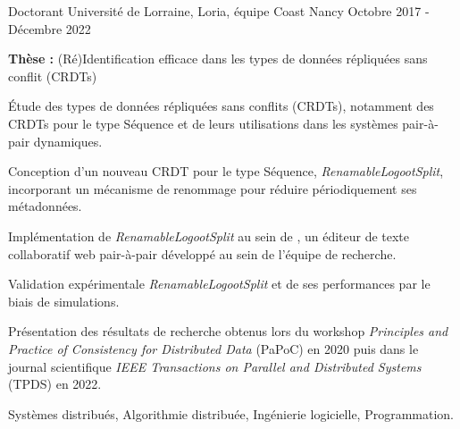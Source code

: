 
\begin{cventries}

\cventry
    {Doctorant}
    {Université de Lorraine, Loria, équipe Coast}
    {Nancy}
    {Octobre 2017 - Décembre 2022}
    {}

\vspace{-1.5em}
\begin{cvparagraph}
    \textbf{Thèse :} (Ré)Identification efficace dans les types de données répliquées sans conflit (CRDTs)

    \medskip
    \begin{cvitems} %
        \item Étude des types de données répliquées sans conflits (CRDTs), notamment des CRDTs pour le type Séquence et de leurs utilisations dans les systèmes pair-à-pair dynamiques.
        \item Conception d'un nouveau CRDT pour le type Séquence, \emph{RenamableLogootSplit}, incorporant  un mécanisme de renommage pour réduire périodiquement ses métadonnées.
        \item Implémentation de \emph{RenamableLogootSplit} au sein de , un éditeur de texte collaboratif web pair-à-pair développé au sein de l'équipe de recherche.
        \item Validation expérimentale \emph{RenamableLogootSplit} et de ses performances par le biais de simulations.
        \item Présentation des résultats de recherche obtenus lors du workshop \emph{Principles and Practice of Consistency for Distributed Data} (PaPoC) en 2020 puis dans le journal scientifique \emph{IEEE Transactions on Parallel and Distributed Systems} (TPDS) en 2022.
    \end{cvitems}

    \bigskip
    \begin{description}[labelindent=1.6em,itemsep=-0.3em]
        \item {}
        \item {}
    \end{description}

    \medskip
     Systèmes distribués, Algorithmie distribuée, Ingénierie logicielle, Programmation.
\end{cvparagraph}


\end{cventries}
